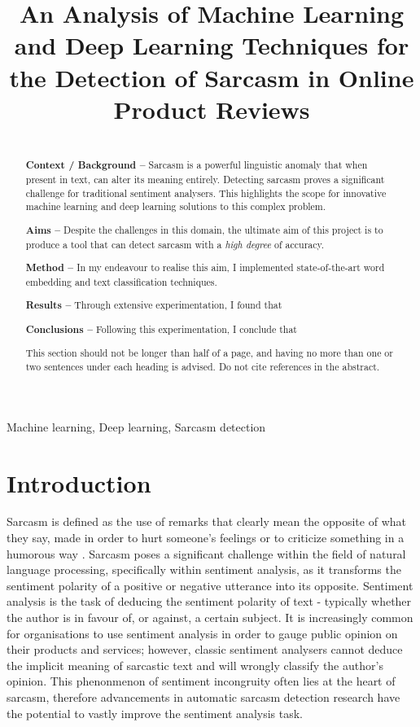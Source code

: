 \documentclass[12pt,a4paper]{article}
\title{An Analysis of Machine Learning and Deep Learning Techniques for the Detection of Sarcasm in Online Product Reviews}
\author{} %
\date{}
\begin{document}
\maketitle

\begin{abstract}
\\ \indent \textbf{Context / Background --} 
Sarcasm is a powerful linguistic anomaly that when present in text, can alter its meaning entirely. Detecting sarcasm proves a significant challenge for traditional sentiment analysers. This highlights the scope for innovative machine learning and deep learning solutions to this complex problem.

\indent \textbf{Aims --} Despite the challenges in this domain, the ultimate aim of this project is to produce a tool that can detect sarcasm with a \textit{high degree} of accuracy.

\indent \textbf{Method --} In my endeavour to realise this aim, I implemented state-of-the-art word embedding and text classification techniques.

\indent \textbf{Results --} Through extensive experimentation, I found that

\indent \textbf{Conclusions --} Following this experimentation, I conclude that

This section should not be longer than half of a page, and having no more than one or two sentences under each heading is advised. Do not cite references in the abstract.
\end{abstract}

\begin{keywords}
Machine learning, Deep learning, Sarcasm detection
\end{keywords}

\newpage

\section{Introduction}
\noindent Sarcasm is defined as the use of remarks that clearly mean the opposite of what they say, made in order to hurt someone's feelings or to criticize something in a humorous way \cite{cambridgesarcasm2020}. Sarcasm poses a significant challenge within the field of natural language processing, specifically within sentiment analysis, as it transforms the sentiment polarity of a positive or negative utterance into its opposite. Sentiment analysis is the task of deducing the sentiment polarity of text - typically whether the author is in favour of, or against, a certain subject. It is increasingly common for organisations to use sentiment analysis in order to gauge public opinion on their products and services; however, classic sentiment analysers cannot deduce the implicit meaning of sarcastic text and will wrongly classify the author's opinion. This phenonmenon of sentiment incongruity often lies at the heart of sarcasm, therefore advancements in automatic sarcasm detection research have the potential to vastly improve the sentiment analysis task.\\
\end{document}
